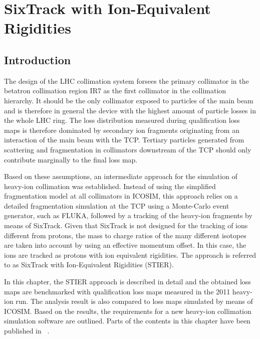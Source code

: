 \chapter{SixTrack with Ion-Equivalent Rigidities }\label{chap:stier}
%
\section*{Introduction}
The design of the LHC collimation system forsees the primary collimator in the betatron collimation region IR7 as the first collimator in the collimation hierarchy. It should be the only collimator exposed to particles of the main beam and is therefore in general the device with the highest amount of particle losses in the whole LHC ring. The loss distribution measured during qualification loss maps is therefore dominated by secondary ion fragments originating from an interaction of the main beam with the TCP. Tertiary particles generated from scattering and fragmentation in collimators downstream of the TCP should only contribute marginally to the final loss map. 

Based on these assumptions, an intermediate approach for the simulation of heavy-ion collimation was established. Instead of using the simplified fragmentation model at all collimators in ICOSIM, this approach relies on a detailed fragmentation simulation at the TCP using a Monte-Carlo event generator, such as \textsc{FLUKA}, followed by a tracking of the heavy-ion fragments by means of SixTrack. Given that SixTrack is not designed for the tracking of ions different from protons, the mass to charge ratios of the many different isotopes are taken into account by using an effective momentum offset. In this case, the ions are tracked as protons with ion equivalent rigidities. The approach is referred to as SixTrack with Ion-Equivalent Rigidities (STIER). 

In this chapter, the STIER approach is described in detail and the obtained loss maps are benchmarked with qualification loss maps measured in the 2011 heavy-ion run. The analysis result is also compared to loss maps simulated by means of ICOSIM. Based on the results, the requirements for a new heavy-ion collimation simulation software are outlined. Parts of the contents in this chapter have been published in ~\cite{hermes_nim}.

\newpage
